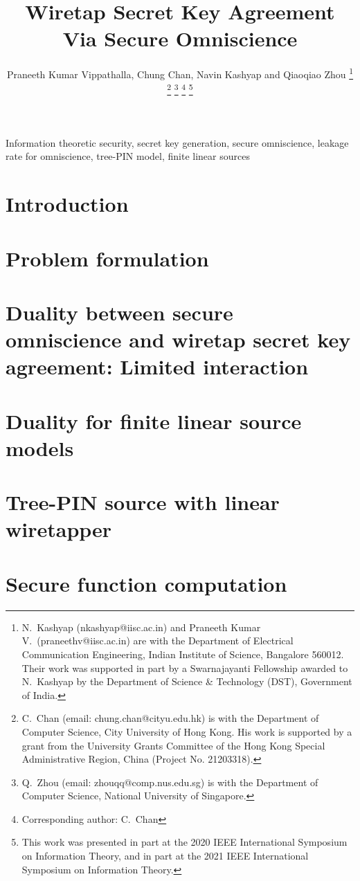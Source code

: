 \documentclass[draftclsnofoot,onecolumn]{IEEEtran}
\title{Wiretap Secret Key Agreement \\Via Secure Omniscience}
\author{Praneeth Kumar Vippathalla, Chung Chan, Navin Kashyap and Qiaoqiao Zhou
\thanks{N.\ Kashyap (nkashyap@iisc.ac.in) and Praneeth Kumar V.\ (praneethv@iisc.ac.in) are with the Department of Electrical Communication Engineering, Indian Institute of Science, Bangalore 560012. Their work was supported in part by a Swarnajayanti Fellowship awarded to N.\ Kashyap by the Department of Science \& Technology (DST), Government of India.}
\thanks{C.\ Chan (email: chung.chan@cityu.edu.hk) is with the Department of Computer Science, City University of Hong Kong. His work is supported by a grant from the University Grants Committee of the Hong Kong Special Administrative Region, China (Project No. 21203318).}
 \thanks{Q.\ Zhou (email: zhouqq@comp.nus.edu.sg) is with the Department of Computer Science, National University of Singapore.}
 \thanks{Corresponding author: C.\ Chan}
\thanks{This work was presented in part at the 2020 IEEE International Symposium on Information Theory, and in part at the 2021 IEEE International Symposium on Information Theory.}}
\newcommand{\wskc}{C_{\op{W}}}
\begin{document}
\IEEEoverridecommandlockouts

\maketitle
\begin{abstract}
  
\end{abstract} 

\begin{IEEEkeywords}
Information theoretic security, secret key generation, secure omniscience, leakage rate for omniscience, tree-PIN model, finite linear sources
\end{IEEEkeywords}

\section{Introduction} \label{sec:introduction}


\section{Problem formulation}\label{sec:problem}


\section{Duality between secure omniscience and wiretap secret key agreement: Limited interaction}\label{sec:counterexamaple_duality}


\section{Duality for finite linear source models}\label{sec:duality_fls}


\section{Tree-PIN source with linear wiretapper}\label{sec:treepin}


% 
{\section{Secure function computation\label{sec:funcomp}}}

\end{document}
